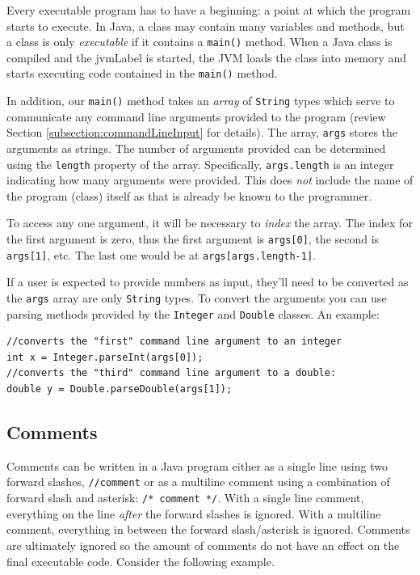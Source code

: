 Every executable program has to have a beginning: a point at which the
program starts to execute.  In Java, a class may contain many variables 
and methods, but a class is only \emph{executable} if it contains a 
\texttt{main()} method.  When a Java class is compiled and
the \gls{jvmLabel} is started, the JVM loads the class into memory and 
starts executing code contained in the \texttt{main()} method.

In addition, our \texttt{main()} method takes an \emph{array}
of \texttt{String} types which serve to communicate
any command line arguments provided to the program (review Section
\ref{subsection:commandLineInput} for details).  The array, 
\texttt{args} stores the arguments as strings.  The number
of arguments provided can be determined using the \texttt{length}
property of the array.  Specifically, \texttt{args.length} is
an integer indicating how many arguments were provided.  This does 
\emph{not} include the name of the program (class) itself as that is
already be known to the programmer.

To access any one argument, it will be necessary to
\emph{index} the array.  The index for the first argument is zero, thus the
first argument is \texttt{args[0]}, the second is \texttt{args[1]}, etc.
The last one would be at \texttt{args[args.length-1]}.

If a user is expected to provide numbers as input, they'll need to
be converted as the \texttt{args} array are only \texttt{String}
types.  To convert the arguments you can use parsing methods provided by the 
\texttt{Integer} and \texttt{Double} classes.
An example:

\begin{verbatim}
//converts the "first" command line argument to an integer
int x = Integer.parseInt(args[0]);  
//converts the "third" command line argument to a double:
double y = Double.parseDouble(args[1]);
\end{verbatim}

\subsection{Comments}

Comments can be written in a Java program either as a single line using
two forward slashes, \texttt{//comment} or as a multiline comment using
a combination of forward slash and asterisk: \texttt{/* comment */}.  
With a single line comment, everything on the line \emph{after} the forward
slashes is ignored.  With a multiline comment, everything in between the forward
slash/asterisk is ignored.  Comments are ultimately ignored so
the amount of comments do not have an effect on the final executable code.
Consider the following example.

